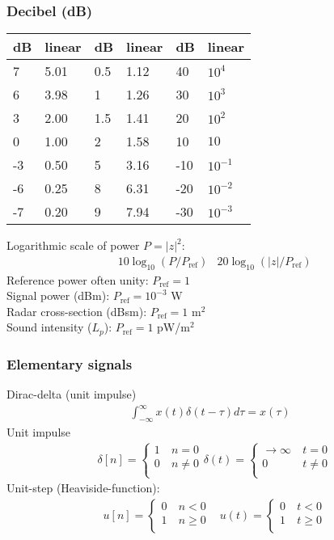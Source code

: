 \documentclass[6pt,landscape,a4paper]{article}
\begin{document}
\begin{multicols*}{5}
\subsubsection*{Decibel (dB)}
\begin{tabularx}{\columnwidth}{ll|ll|ll}
dB & linear & dB & linear & dB & linear \\
\hline
7  & 5.01 & 0.5 & 1.12 & 40 & $10^{4}$ \\
6  & 3.98 & 1 & 1.26 & 30 & $10^{3}$ \\
3  & 2.00 &  1.5 & 1.41 & 20 &$10^{2}$  \\
0  & 1.00 & 2 & 1.58 & 10 &  $10$\\
-3  & 0.50 & 5 & 3.16 & -10 & $10^{-1}$ \\
-6  & 0.25 & 8 & 6.31 & -20 & $10^{-2}$ \\
-7  & 0.20 & 9 & 7.94 & -30 & $10^{-3}$ \\
\end{tabularx}
Logarithmic scale of power $P=|z|^2$:
\begin{align*}
 &10 \log_{10}(P/P_{\mathrm{ref}})
 &20 \log_{10}(|z|/P_{\mathrm{ref}})
\end{align*}
Reference power often unity: $P_{\mathrm{ref}}=1$\\
Signal power (dBm): $P_{\mathrm{ref}}=10^{-3}$ W\\
Radar cross-section (dBsm): $P_{\mathrm{ref}}=1$ m$^{2}$\\
Sound intensity ($L_p$): $P_{\mathrm{ref}}=1$ pW/m$^{2}$ 
\subsubsection*{Elementary signals}
Dirac-delta (unit impulse)
\begin{align*}
\textstyle\int_{-\infty}^{\infty} x(t) \delta(t-\tau)d\tau = x(\tau)
\end{align*}
Unit impulse
\begin{align*}
  &\delta[n] = \left\{\begin{array}{cl}
    1 & ~ n = 0   \\
    0 & ~ n \ne 0 \\
  \end{array}
\right.
  \delta(t) = \left\{\begin{array}{cl}
    \rightarrow \infty & ~ t = 0   \\
    0 & ~t \ne 0 \\
  \end{array}
  \right.
\end{align*}
Unit-step (Heaviside-function):
\begin{align*}
&  u[n] = \left\{\begin{array}{cl}
    0 & ~ n < 0   \\
    1 & ~ n \ge 0 \\
  \end{array}
  \right.
&  u(t) = \left\{\begin{array}{cl}
    0 & ~ t < 0   \\
    1 & ~ t \ge 0 \\
  \end{array}
  \right. 
\end{align*}


\end{multicols*}
\end{document}
